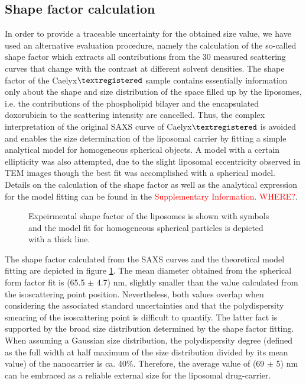 \subsection{Shape factor calculation}
In order to provide a traceable uncertainty for the obtained size value, we have used an alternative evaluation procedure, namely the calculation of the so-called shape factor which extracts all contributions from the 30 measured scattering curves that change with the contrast at different solvent densities. The shape factor of the Caelyx$\textregistered$ sample contains essentially information only about the shape and size distribution of the space filled up by the liposomes, i.e. the contributions of the phospholipid bilayer and the encapsulated doxorubicin to the scattering intensity are cancelled.  Thus, the complex interpretation of the original SAXS curve of Caelyx$\textregistered$ is avoided and enables the size determination of the liposomal carrier by fitting a simple analytical model for homogeneous spherical objects. A model with a certain ellipticity was also attempted, due to the slight liposomal eccentricity observed in TEM images though the best fit was accomplished with a spherical model. Details on the calculation of the shape factor as well as the analytical expression for the model fitting can be found in the \textcolor{red}{Supplementary Information.  WHERE?}. 

\begin{figure}
	\centering
		
		\caption{Expeirmental shape factor of the liposomes is shown with symbols and the model fit for homogeneous spherical particles is depicted with a thick line.}
		\label{fig:CaelyxIodixanolResonantTerm}
\end{figure}

The shape factor calculated from the SAXS curves and the theoretical model fitting are depicted in figure \ref{fig:CaelyxIodixanolResonantTerm}. The mean diameter obtained from the spherical form factor fit is (65.5 $\pm$ 4.7) nm, slightly smaller than the value calculated from the isoscattering point position. Nevertheless, both values overlap when considering the associated standard uncertainties and that the polydispersity smearing of the isoscattering point is difficult to quantify. The latter fact is supported by the broad size distribution determined by the shape factor fitting. When assuming a Gaussian size distribution, the polydispersity degree (defined as the full width at half maximum of the size distribution divided by its mean value) of the nanocarrier is ca. 40$\%$. Therefore, the average value of (69 $\pm$ 5) nm can be embraced as a reliable external size for the liposomal drug-carrier.

